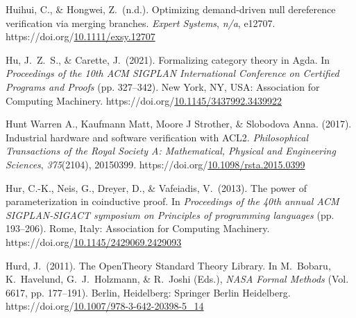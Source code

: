 \documentclass[12pt,twoside]{article}
\begin{document}
{\begin{thebibliography}{1079}
\mdbibitemlabel{}Huihui, C., \& Hongwei, Z.~(n.d.). Optimizing demand-driven null dereference verification via merging branches. \emph{Expert Systems}, \emph{n/a}, e12707. https://doi.org/\href{https://dx.doi.org/10.1111/exsy.12707}{10.1111/exsy.12707}%

\mdbibitemlabel{}Hu, J.~Z.~S., \& Carette, J.~(2021). Formalizing category theory in Agda. In \emph{Proceedings of the 10th ACM SIGPLAN International Conference on Certified Programs and Proofs} (pp. 327–342). New York, NY, USA: Association for Computing Machinery. https://doi.org/\href{https://dx.doi.org/10.1145/3437992.3439922}{10.1145/3437992.3439922}%

\mdbibitemlabel{}Hunt Warren A., Kaufmann Matt, Moore J Strother, \& Slobodova Anna. (2017). Industrial hardware and software verification with ACL2. \emph{Philosophical Transactions of the Royal Society A: Mathematical, Physical and Engineering Sciences}, \emph{375}(2104), 20150399. https://doi.org/\href{https://dx.doi.org/10.1098/rsta.2015.0399}{10.1098/rsta.2015.0399}%

\mdbibitemlabel{}Hur, C.-K., Neis, G., Dreyer, D., \& Vafeiadis, V.~(2013). The power of parameterization in coinductive proof. In \emph{Proceedings of the 40th annual ACM SIGPLAN-SIGACT symposium on Principles of programming languages} (pp. 193–206). Rome, Italy: Association for Computing Machinery. https://doi.org/\href{https://dx.doi.org/10.1145/2429069.2429093}{10.1145/2429069.2429093}%

\mdbibitemlabel{}Hurd, J.~(2011). The OpenTheory Standard Theory Library. In M.~Bobaru, K.~Havelund, G.~J.~Holzmann, \& R.~Joshi (Eds.), \emph{NASA Formal Methods} (Vol. 6617, pp. 177–191). Berlin, Heidelberg: Springer Berlin Heidelberg. https://doi.org/\href{https://dx.doi.org/10.1007/978-3-642-20398-5_14}{10.1007/978-3-642-20398-5\_14}%


\end{thebibliography}}
\end{document}
